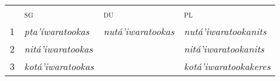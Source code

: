 \begin{exe}
\begin{xlist}
    \begin{tabular}{llll}
    ~ &\textsc{sg}&\textsc{du}&\textsc{pl}\\
    1&  \textit{pta'íwaratookas}&   \textit{nutá'iwaratookas}                                         &\textit{nutá'iwaratookanits}\\
    2&  \textit{nitá'iwaratookas}&    &\textit{nitá'iwaratookanits}\\
    3&  \textit{kotá'iwaratookas}&    &\textit{kotá'iwaratookakeres}
    \end{tabular} 


    


    
\end{xlist}

\end{exe}

